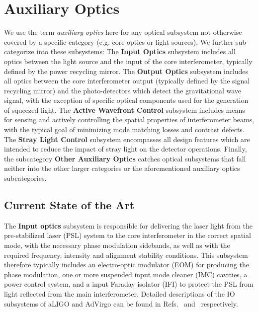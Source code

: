 \chapter{Auxiliary Optics}
\label{sec:Aux-optics}

We use the term \emph{auxiliary optics} here for any optical subsystem not otherwise covered by a specific category (e.g. core optics or light sources). We further sub-categorize into these subsystems:
The {\bf Input Optics} subsystem includes all optics between the light source and the input of the core interferometer, typically defined by the power recycling mirror. The {\bf Output Optics} subsystem includes all optics between the core interferometer output (typically defined by the signal recycling mirror) and the photo-detectors which detect the gravitational wave signal, with the exception of specific optical components used for the generation of squeezed light. The {\bf Active Wavefront Control} subsystem includes means for sensing and actively controlling the spatial properties of interferometer beams, with the typical goal of minimizing mode matching losses and contrast defects. The {\bf Stray Light Control} subsystem encompasses all design features which are intended to reduce the impact of stray light on the detector operations. Finally, the subcategory {\bf Other Auxiliary Optics} catches optical subsystems that fall neither into the other larger categories or the aforementioned auxiliary optics subcategories.

\section{Current State of the Art}
The {\bf Input optics} subsystem is responsible for delivering the laser light from the pre-stabilized laser (PSL) system to the core interferometer in the correct spatial mode, with the necessary phase modulation sidebands, as well as with the required frequency, intensity and alignment stability conditions. This subsystem therefore typically includes an electro-optic modulator (EOM) for producing the phase modulation, one or more suspended input mode cleaner (IMC) cavities, a power control system, and a input Faraday isolator (IFI) to protect the PSL from light reflected from the main interferometer. Detailed descriptions of the IO subsystems of aLIGO and AdVirgo can be found in Refs.~\cite{aLIGO_IO} and~\cite{IOchapter} respectively. 

